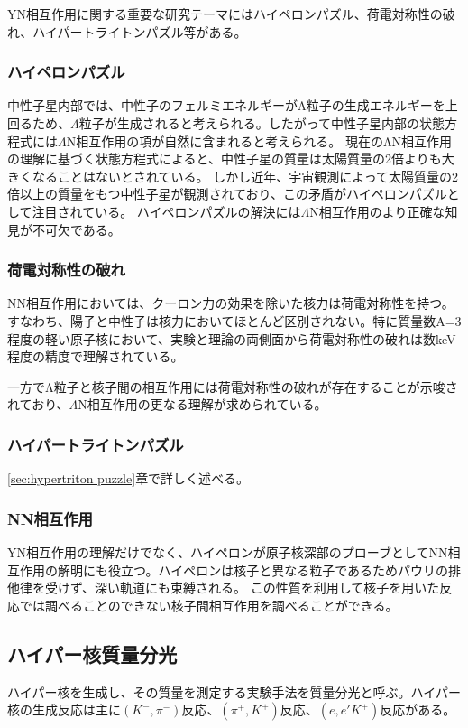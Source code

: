 \documentclass[a4paper,11pt,uplatex]{jsbook}
\begin{document}
YN相互作用に関する重要な研究テーマにはハイペロンパズル、荷電対称性の破れ、ハイパートライトンパズル等がある。
\subsubsection{ハイペロンパズル}
中性子星内部では、中性子のフェルミエネルギーがΛ粒子の生成エネルギーを上回るため、$\Lambda$粒子が生成されると考えられる。したがって中性子星内部の状態方程式には$\Lambda$N相互作用の項が自然に含まれると考えられる。
現在のΛN相互作用の理解に基づく状態方程式によると、中性子星の質量は太陽質量の2倍よりも大きくなることはないとされている。
しかし近年、宇宙観測によって太陽質量の2倍以上の質量をもつ中性子星が観測されており、この矛盾がハイペロンパズルとして注目されている。
ハイペロンパズルの解決には$\Lambda$N相互作用のより正確な知見が不可欠である。
\subsubsection{荷電対称性の破れ}
NN相互作用においては、クーロン力の効果を除いた核力は荷電対称性を持つ。すなわち、陽子と中性子は核力においてほとんど区別されない。特に質量数A=3程度の軽い原子核において、実験と理論の両側面から荷電対称性の破れは数keV程度の精度で理解されている。

一方でΛ粒子と核子間の相互作用には荷電対称性の破れが存在することが示唆されており、$\Lambda$N相互作用の更なる理解が求められている。
\subsubsection{ハイパートライトンパズル}
\ref{sec:hypertriton puzzle}章で詳しく述べる。
\subsubsection{NN相互作用}
YN相互作用の理解だけでなく、ハイペロンが原子核深部のプローブとしてNN相互作用の解明にも役立つ。ハイペロンは核子と異なる粒子であるためパウリの排他律を受けず、深い軌道にも束縛される。
この性質を利用して核子を用いた反応では調べることのできない核子間相互作用を調べることができる。%
\subsection{ハイパー核質量分光}
ハイパー核を生成し、その質量を測定する実験手法を質量分光と呼ぶ。ハイパー核の生成反応は主に$(K^-, \pi^-)$反応、$(\pi^+, K^+)$反応、$(e,e'K^+)$反応がある。
\end{document}
